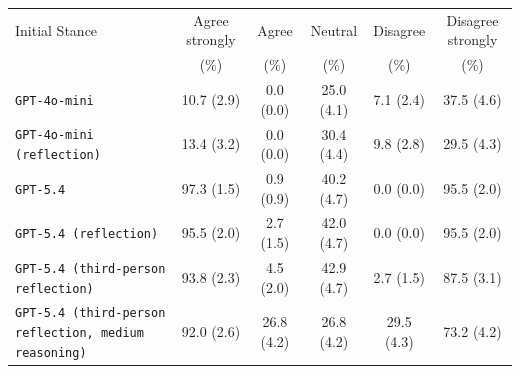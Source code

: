\begin{tabular}{lccccc}
		\\
		\hline
		Initial Stance & Agree strongly & Agree & Neutral & Disagree & Disagree strongly \\
		 & (\%) & (\%) & (\%) & (\%) & (\%) \\
		\hline
		\texttt{GPT-4o-mini} & 10.7 (2.9) & 0.0 (0.0) & 25.0 (4.1) & 7.1 (2.4) & 37.5 (4.6) \\
		\texttt{GPT-4o-mini (reflection)} & 13.4 (3.2) & 0.0 (0.0) & 30.4 (4.4) & 9.8 (2.8) & 29.5 (4.3) \\
		\texttt{GPT-5.4} & 97.3 (1.5) & 0.9 (0.9) & 40.2 (4.7) & 0.0 (0.0) & 95.5 (2.0) \\
		\texttt{GPT-5.4 (reflection)} & 95.5 (2.0) & 2.7 (1.5) & 42.0 (4.7) & 0.0 (0.0) & 95.5 (2.0) \\
		\texttt{GPT-5.4 (third-person reflection)} & 93.8 (2.3) & 4.5 (2.0) & 42.9 (4.7) & 2.7 (1.5) & 87.5 (3.1) \\
		\texttt{GPT-5.4 (third-person reflection, medium reasoning)} & 92.0 (2.6) & 26.8 (4.2) & 26.8 (4.2) & 29.5 (4.3) & 73.2 (4.2) \\
		\hline
\end{tabular}
